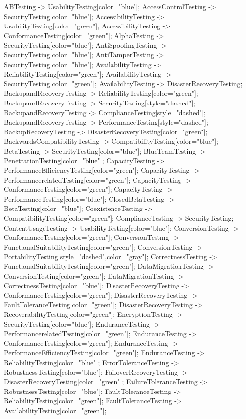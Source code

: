 \documentclass{article}
\begin{document}
{ABTesting -> UsabilityTesting[color="blue"];
AccessControlTesting -> SecurityTesting[color="blue"];
AccessibilityTesting -> UsabilityTesting[color="green"];
AccessibilityTesting -> ConformanceTesting[color="green"];
AlphaTesting -> SecurityTesting[color="blue"];
AntiSpoofingTesting -> SecurityTesting[color="blue"];
AntiTamperTesting -> SecurityTesting[color="blue"];
AvailabilityTesting -> ReliabilityTesting[color="green"];
AvailabilityTesting -> SecurityTesting[color="green"];
AvailabilityTesting -> DisasterRecoveryTesting;
BackupandRecoveryTesting -> ReliabilityTesting[color="green"];
BackupandRecoveryTesting -> SecurityTesting[style="dashed"];
BackupandRecoveryTesting -> ComplianceTesting[style="dashed"];
BackupandRecoveryTesting -> PerformanceTesting[style="dashed"];
BackupRecoveryTesting -> DisasterRecoveryTesting[color="green"];
BackwardsCompatibilityTesting -> CompatibilityTesting[color="blue"];
BetaTesting -> SecurityTesting[color="blue"];
BlueTeamTesting -> PenetrationTesting[color="blue"];
CapacityTesting -> PerformanceEfficiencyTesting[color="green"];
CapacityTesting -> PerformancerelatedTesting[color="green"];
CapacityTesting -> ConformanceTesting[color="green"];
CapacityTesting -> PerformanceTesting[color="blue"];
ClosedBetaTesting -> BetaTesting[color="blue"];
CoexistenceTesting -> CompatibilityTesting[color="green"];
ComplianceTesting -> SecurityTesting;
ContentUsageTesting -> UsabilityTesting[color="blue"];
ConversionTesting -> ConformanceTesting[color="green"];
ConversionTesting -> FunctionalSuitabilityTesting[color="green"];
ConversionTesting -> PortabilityTesting[style="dashed",color="gray"];
CorrectnessTesting -> FunctionalSuitabilityTesting[color="green"];
DataMigrationTesting -> ConversionTesting[color="green"];
DataMigrationTesting -> CorrectnessTesting[color="blue"];
DisasterRecoveryTesting -> ConformanceTesting[color="green"];
DisasterRecoveryTesting -> FaultToleranceTesting[color="green"];
DisasterRecoveryTesting -> RecoverabilityTesting[color="green"];
EncryptionTesting -> SecurityTesting[color="blue"];
EnduranceTesting -> PerformancerelatedTesting[color="green"];
EnduranceTesting -> ConformanceTesting[color="green"];
EnduranceTesting -> PerformanceEfficiencyTesting[color="green"];
EnduranceTesting -> ReliabilityTesting[color="blue"];
ErrorToleranceTesting -> RobustnessTesting[color="blue"];
FailoverRecoveryTesting -> DisasterRecoveryTesting[color="green"];
FailureToleranceTesting -> RobustnessTesting[color="blue"];
FaultToleranceTesting -> ReliabilityTesting[color="green"];
FaultToleranceTesting -> AvailabilityTesting[color="green"];
}
\end{document}
